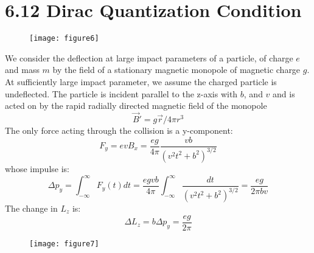 \documentclass{article}
\begin{document}
	\section*{6.12 Dirac Quantization Condition}
	
	\begin{figure}[h]
		\centering
		\texttt{[image: figure6]}
		\caption{}
		\label{fig:figure6}
	\end{figure}
	
	We consider the deflection at large impact parameters of a particle, of charge $e$ and mass $m$ by the field of a stationary magnetic monopole of magnetic charge $g$. At sufficiently large impact parameter, we assume the charged particle is undeflected.
	The particle is incident parallel to the z-axis with $b$, and $v$ and is acted on by the rapid radially directed magnetic field of the monopole
	\begin{equation}
		\vec{B}' = g \vec{r} / 4\pi r^3
	\end{equation}
	The only force acting through the collision is a y-component:
	\begin{equation}
		F_y = evB_x = \frac{eg}{4\pi} \frac{vb}{(v^2t^2+b^2)^{3/2}}
	\end{equation}
	whose impulse is:
	\begin{equation}
		\Delta p_y = \int_{-\infty}^{\infty} F_y(t) dt = \frac{egvb}{4\pi} \int_{-\infty}^{\infty} \frac{dt}{(v^2t^2+b^2)^{3/2}} = \frac{eg}{2\pi b v}
	\end{equation}
	The change in $L_z$ is:
	\begin{equation}
		\Delta L_z = b \Delta p_y = \frac{eg}{2\pi}
	\end{equation}
	
	\begin{figure}[h]
		\centering
		\texttt{[image: figure7]}
		\caption{}
		\label{fig:figure7}
	\end{figure}
	
\end{document}
